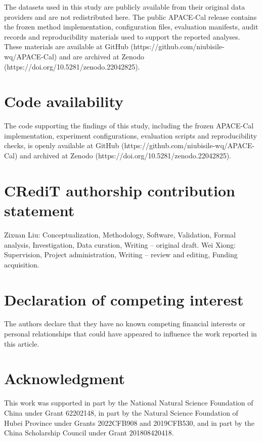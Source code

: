 \documentclass[preprint,12pt]{elsarticle}
\begin{document}
The datasets used in this study are publicly available from their original data providers and are not redistributed here. The public APACE-Cal release contains the frozen method implementation, configuration files, evaluation manifests, audit records and reproducibility materials used to support the reported analyses. These materials are available at GitHub (https://github.com/niubisile-wq/APACE-Cal) and are archived at Zenodo (https://doi.org/10.5281/zenodo.22042825).

\section*{Code availability}

The code supporting the findings of this study, including the frozen APACE-Cal implementation, experiment configurations, evaluation scripts and reproducibility checks, is openly available at GitHub (https://github.com/niubisile-wq/APACE-Cal) and archived at Zenodo (https://doi.org/10.5281/zenodo.22042825).

\section*{CRediT authorship contribution statement}

Zixuan Liu: Conceptualization, Methodology, Software, Validation, Formal analysis, Investigation, Data curation, Writing -- original draft. Wei Xiong: Supervision, Project administration, Writing -- review and editing, Funding acquisition.

\section*{Declaration of competing interest}

The authors declare that they have no known competing financial interests or personal relationships that could have appeared to influence the work reported in this article.

\section*{Acknowledgment}

This work was supported in part by the National Natural Science Foundation of China under Grant 62202148, in part by the Natural Science Foundation of Hubei Province under Grants 2022CFB908 and 2019CFB530, and in part by the China Scholarship Council under Grant 201808420418.



\end{document}
